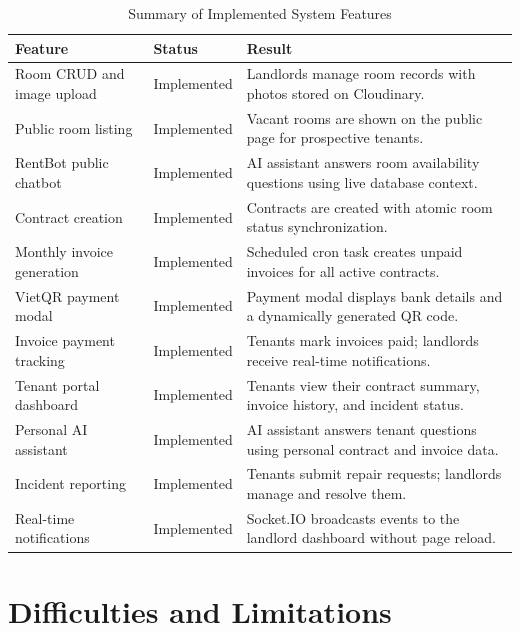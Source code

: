 \begin{table}[H]
    \centering
    \renewcommand{\arraystretch}{1.2}
    \begin{tabular}{|l|l|p{7cm}|}
        \hline
        \textbf{Feature} & \textbf{Status} & \textbf{Result} \\
        \hline
        Room CRUD and image upload & Implemented & Landlords manage room records with photos stored on Cloudinary. \\
        \hline
        Public room listing & Implemented & Vacant rooms are shown on the public page for prospective tenants. \\
        \hline
        RentBot public chatbot & Implemented & AI assistant answers room availability questions using live database context. \\
        \hline
        Contract creation & Implemented & Contracts are created with atomic room status synchronization. \\
        \hline
        Monthly invoice generation & Implemented & Scheduled cron task creates unpaid invoices for all active contracts. \\
        \hline
        VietQR payment modal & Implemented & Payment modal displays bank details and a dynamically generated QR code. \\
        \hline
        Invoice payment tracking & Implemented & Tenants mark invoices paid; landlords receive real-time notifications. \\
        \hline
        Tenant portal dashboard & Implemented & Tenants view their contract summary, invoice history, and incident status. \\
        \hline
        Personal AI assistant & Implemented & AI assistant answers tenant questions using personal contract and invoice data. \\
        \hline
        Incident reporting & Implemented & Tenants submit repair requests; landlords manage and resolve them. \\
        \hline
        Real-time notifications & Implemented & Socket.IO broadcasts events to the landlord dashboard without page reload. \\
        \hline
    \end{tabular}
    \caption{Summary of Implemented System Features}
    \label{tab:implemented_features}
\end{table}

\section{Difficulties and Limitations}

